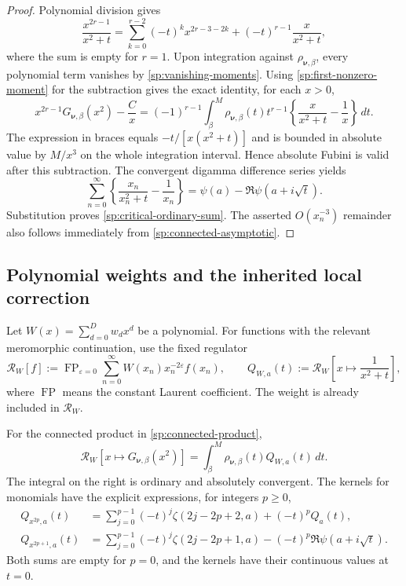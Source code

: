 \begin{proof}
Polynomial division gives
\[
 \frac{x^{2r-1}}{x^2+t}
 =\sum_{k=0}^{r-2}(-t)^k x^{2r-3-2k}
          +(-t)^{r-1}\frac{x}{x^2+t},
\]
where the sum is empty for $r=1$.
Upon integration against $\rho_{\boldsymbol\nu,\beta}$, every
polynomial term vanishes by \eqref{sp:vanishing-moments}.
Using \eqref{sp:first-nonzero-moment} for the subtraction gives
the exact identity, for each $x>0$,
\[
 x^{2r-1}G_{\boldsymbol\nu,\beta}(x^2)-\frac{C}{x}
 =(-1)^{r-1}\int_\beta^M
       \rho_{\boldsymbol\nu,\beta}(t)t^{r-1}
             \left\{\frac{x}{x^2+t}-\frac1x\right\}\,dt.
\]
The expression in braces equals $-t/[x(x^2+t)]$ and is bounded
in absolute value by $M/x^3$ on the whole integration interval.
Hence absolute Fubini is valid after this subtraction.
The convergent digamma difference series yields
\[
 \sum_{n=0}^{\infty}
       \left\{\frac{x_n}{x_n^2+t}-\frac1{x_n}\right\}
       =\psi(a)-\Re\psi(a+i\sqrt t).
\]
Substitution proves \eqref{sp:critical-ordinary-sum}.
The asserted $O(x_n^{-3})$ remainder also follows immediately
from \eqref{sp:connected-asymptotic}.
\end{proof}

\subsection{Polynomial weights and the inherited local correction}
\label{sp:weighted-bridge}

Let $W(x)=\sum_{d=0}^{D}w_dx^d$ be a polynomial.  For functions
with the relevant meromorphic continuation, use the fixed
regulator
\begin{equation}
 \mathcal R_W[f]
 :=\operatorname{FP}_{\varepsilon=0}
     \sum_{n=0}^{\infty}W(x_n)x_n^{-2\varepsilon}f(x_n),
 \qquad
 Q_{W,a}(t):=\mathcal R_W\left[x\longmapsto\frac{1}{x^2+t}\right],
 \label{sp:fixed-regulator}
\end{equation}
where $\operatorname{FP}$ means the constant Laurent coefficient.
The weight is already included in $\mathcal R_W$.

\begin{proposition}
\label{sp:weighted-compact}
For the connected product in \eqref{sp:connected-product},
\begin{equation}
 \mathcal R_W[x\longmapsto G_{\boldsymbol\nu,\beta}(x^2)]
 =\int_\beta^M\rho_{\boldsymbol\nu,\beta}(t)Q_{W,a}(t)\,dt.
 \label{sp:weighted-compact-transform}
\end{equation}
The integral on the right is ordinary and absolutely convergent.
The kernels for monomials have the explicit expressions, for
integers $p\geq0$,
\begin{align}
 Q_{x^{2p},a}(t)
 &=\sum_{j=0}^{p-1}(-t)^j\zeta(2j-2p+2,a)
                        +(-t)^pQ_a(t),
 \label{sp:even-weight-kernel}\\
 Q_{x^{2p+1},a}(t)
 &=\sum_{j=0}^{p-1}(-t)^j\zeta(2j-2p+1,a)
                        -(-t)^p\Re\psi(a+i\sqrt t).
 \label{sp:odd-weight-kernel}
\end{align}
Both sums are empty for $p=0$, and the kernels have their
continuous values at $t=0$.
\end{proposition}

